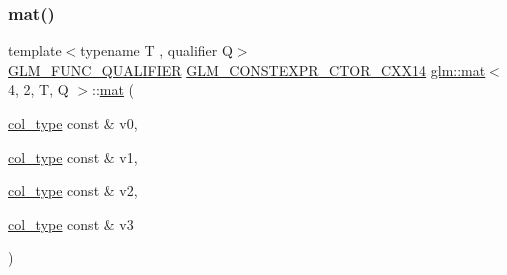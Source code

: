 \mbox{\label{structglm_1_1mat_3_014_00_012_00_01_t_00_01_q_01_4_a86b1d46dbc91a07cb6010974c6a2ad98}} 
\subsubsection{\texorpdfstring{mat()}{mat()}\hspace{0.1cm}{\footnotesize\ttfamily [6/21]}}
{\footnotesize\ttfamily template$<$typename T , qualifier Q$>$ \\
\mbox{\hyperlink{setup_8hpp_a33fdea6f91c5f834105f7415e2a64407}{G\+L\+M\+\_\+\+F\+U\+N\+C\+\_\+\+Q\+U\+A\+L\+I\+F\+I\+ER}} \mbox{\hyperlink{setup_8hpp_a0900f9145e68bf6061b6f5e7be3fa751}{G\+L\+M\+\_\+\+C\+O\+N\+S\+T\+E\+X\+P\+R\+\_\+\+C\+T\+O\+R\+\_\+\+C\+X\+X14}} \mbox{\hyperlink{structglm_1_1mat}{glm\+::mat}}$<$ 4, 2, T, Q $>$\+::\mbox{\hyperlink{structglm_1_1mat}{mat}} (\begin{DoxyParamCaption}\item[{\mbox{\hyperlink{structglm_1_1mat_3_014_00_012_00_01_t_00_01_q_01_4_a60138ab077eb3bef96e654e672af5059}{col\+\_\+type}} const \&}]{v0,  }\item[{\mbox{\hyperlink{structglm_1_1mat_3_014_00_012_00_01_t_00_01_q_01_4_a60138ab077eb3bef96e654e672af5059}{col\+\_\+type}} const \&}]{v1,  }\item[{\mbox{\hyperlink{structglm_1_1mat_3_014_00_012_00_01_t_00_01_q_01_4_a60138ab077eb3bef96e654e672af5059}{col\+\_\+type}} const \&}]{v2,  }\item[{\mbox{\hyperlink{structglm_1_1mat_3_014_00_012_00_01_t_00_01_q_01_4_a60138ab077eb3bef96e654e672af5059}{col\+\_\+type}} const \&}]{v3 }\end{DoxyParamCaption})}

\mbox{\label{structglm_1_1mat_3_014_00_012_00_01_t_00_01_q_01_4_ab215b674606585326f67e984d3eaf832}} 

